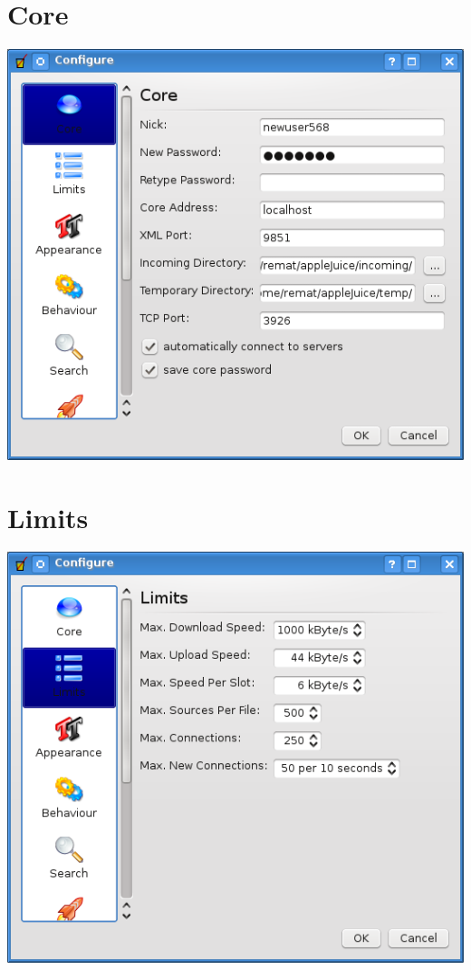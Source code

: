 \documentclass[a4paper,10pt]{book}
\begin{document}
\section{Core}
\label{sec:conf_core}
\includegraphics[width=1.0\textwidth]{./images/configure_core.png}

\section{Limits}
\label{sec:conf_limits}
\includegraphics[width=1.0\textwidth]{./images/configure_limits.png}
\end{document}
